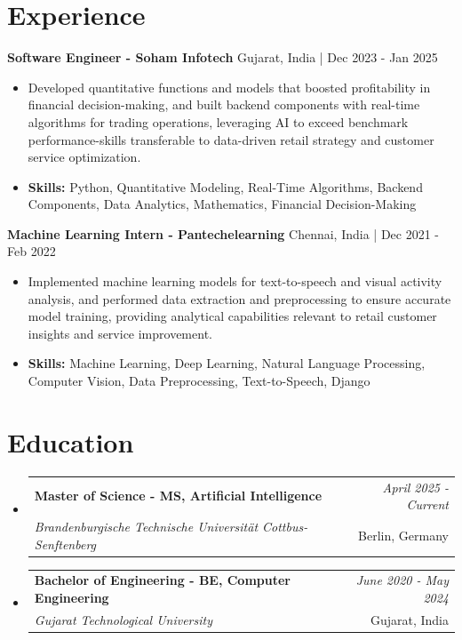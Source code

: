 \documentclass[a4paper,11pt]{article}
\makeatletter
\newcommand{\resumeSubheading}[4]{
\vspace{0.5mm}\item
    \begin{tabular*}{0.98\textwidth}[t]{l@{\extracolsep{\fill}}r}
        \textbf{#1} & \textit{\footnotesize{#4}} \\
        \textit{\footnotesize{#3}} &  \footnotesize{#2}\\
    \end{tabular*}
    \vspace{-2.4mm}
}
\makeatother
\begin{document}
\section{\textbf{Experience}}


\vspace{1mm}
  \textbf{Software Engineer - Soham Infotech} \hfill Gujarat, India | Dec 2023 - Jan 2025
\vspace{-1.5mm} %
\begin{itemize}
  \item Developed quantitative functions and models that boosted profitability in financial decision-making, and built backend components with real-time algorithms for trading operations, leveraging AI to exceed benchmark performance-skills transferable to data-driven retail strategy and customer service optimization.

\vspace{-2mm}
  \item \textbf{Skills:} Python, Quantitative Modeling, Real-Time Algorithms, Backend Components, Data Analytics, Mathematics, Financial Decision-Making
\end{itemize}

\vspace{1mm}
  \textbf{Machine Learning Intern - Pantechelearning} \hfill Chennai, India | Dec 2021 - Feb 2022
\vspace{-1.5mm} %
\begin{itemize}
  \item Implemented machine learning models for text-to-speech and visual activity analysis, and performed data extraction and preprocessing to ensure accurate model training, providing analytical capabilities relevant to retail customer insights and service improvement.
\vspace{-2mm}
  \item \textbf{Skills:} Machine Learning, Deep Learning, Natural Language Processing, Computer Vision, Data Preprocessing, Text-to-Speech, Django
\end{itemize}\section{\textbf{Education}}
\vspace{-0.4mm}

\begin{itemize}
\resumeSubheading
{Master of Science - MS, Artificial Intelligence }{Berlin, Germany}
{Brandenburgische Technische Universität Cottbus-Senftenberg  }{April 2025 - Current}

\vspace{1.0mm} %
\resumeSubheading
{Bachelor of Engineering - BE, Computer Engineering  }{Gujarat, India}
{Gujarat Technological University }{June 2020 - May 2024}

\end{itemize}
\end{document}
